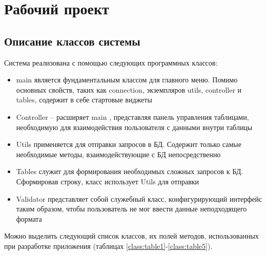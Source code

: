 \section{Рабочий проект}
\subsection{Описание классов системы}
Система реализована с помощью следующих программных классов:

\begin{itemize}
	\item \textquotedbl main \textquotedbl является фундаментальным классом для главного меню. Помимо основных свойств, таких как connection, экземпляров utils, controller и tables, содержит в себе стартовые виджеты
	\item \textquotedbl Controller \textquotedbl -- расширяет \textquotedbl main \textquotedbl, представляя панель управления таблицами, необходимую для взаимодействия пользователя с данными внутри таблицы
	\item \textquotedbl Utils \textquotedbl применяется для отправки запросов в БД. Содержит только самые необходимые методы, взаимодействующие с БД непосредственно
	\item \textquotedbl Tables \textquotedbl служит для формирования необходимых сложных запросов к БД. Сформировав строку, класс использует \textquotedbl Utils \textquotedbl для отправки
	\item \textquotedbl Validator \textquotedbl представляет собой служебный класс, конфигурирующий интерфейс таким образом, чтобы пользователь не мог ввести данные неподходящего формата
\end{itemize}

Можно выделить следующий список классов, их полей методов, использованных при разработке приложения (таблицах \ref{class:table1}-\ref{class:table5}).

